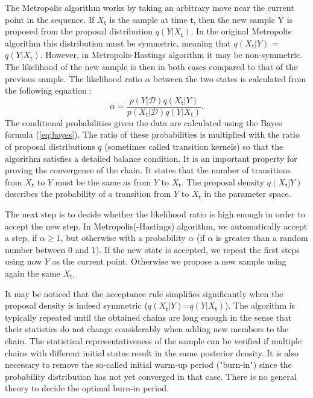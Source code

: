 \documentclass{wihuri}
\def\be{\begin{equation}}
\def\ee{\end{equation}}
\def\tstep{\mathsf{t}}
\begin{document}
The Metropolis algorithm works by taking an arbitrary move near the current
point in the sequence. If $X_{\tstep}$ is the sample at time $\tstep$, then the new sample Y is proposed from the proposal distribution $q(Y|X_{\tstep})$. In the original Metropolis algorithm this distribution must be symmetric, meaning that $q(X_{\tstep}|Y)$ = $q(Y|X_{\tstep})$. However, in Metropolis-Hastings algorithm it may be non-symmetric. The likelihood of the new sample is then in both cases compared to that of the previous sample. The likelihood ratio $\alpha$ between the two states is calculated from the following equation \cite{tuomi}:
\be \label{eq:likely_ratio} 
\alpha = \frac{p(Y|\mathcal{D})q(X_{\tstep}|Y)}{p(X_{\tstep}|\mathcal{D})q(Y|X_{\tstep})}.
\ee
The conditional probabilities given the data are calculated using the Bayes formula (\ref{eq:bayes}). The ratio of these probabilities is multiplied with the ratio of proposal distributions $q$ (sometimes called transition kernels) so that the algorithm satisfies a detailed balance condition. It is an important property for proving the convergence of the chain. It states that the number of transitions from $X_{\tstep}$ to $Y$ must be the same as from $Y$ to $X_{\tstep}$.  The proposal density $q(X_{\tstep}|Y)$ describes the probability of a transition from $Y$ to $X_{\tstep}$ in the parameter space.

The next step is to decide whether the likelihood ratio is high enough in order to accept the new step. In Metropolis(-Hastings) algorithm, we automatically accept a step, if $\alpha \ge 1$, but otherwise with a probability $\alpha$ (if $\alpha$ is greater than a random number between 0 and 1). If the new state is accepted, we repeat the first steps using now $Y$ as the current point. Otherwise we propose a new sample using again the same $X_{\tstep}$. 



It may be noticed that the acceptance rule simplifies significantly when the
proposal density is indeed symmetric ($q(X_{\tstep}|Y)$=$q(Y|X_{\tstep})$). The algorithm is typically repeated until the obtained chains are long enough in the sense that their statistics do not change considerably when adding new members to the chain. The statistical representativeness of the sample can be verified
if multiple chains with different initial states result in the same posterior density. It is also necessary to remove the so-called initial warm-up period ("burn-in") %
since the probability distribution has not yet converged in that case. %
There is no general theory to decide the optimal burn-in period.%
\end{document}
